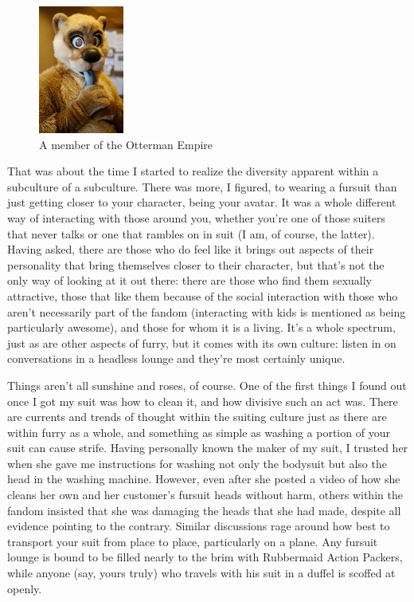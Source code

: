 \begin{figure}
  \begin{center}
    \includegraphics[width=0.25\textwidth]{content/assets/dressing-up--otterman-empire}
  \end{center}
  \caption{A member of the Otterman Empire}
\end{figure}
That was about the time I started to realize the diversity apparent within a subculture of a subculture.  There was more, I figured, to wearing a fursuit than just getting closer to your character, being your avatar.  It was a whole different way of interacting with those around you, whether you're one of those suiters that never talks or one that rambles on in suit (I am, of course, the latter).  Having asked, there are those who do feel like it brings out aspects of their personality that bring themselves closer to their character, but that's not the only way of looking at it out there: there are those who find them sexually attractive, those that like them because of the social interaction with those who aren't necessarily part of the fandom (interacting with kids is mentioned as being particularly awesome), and those for whom it is a living.  It's a whole spectrum, just as are other aspects of furry, but it comes with its own culture: listen in on conversations in a headless lounge and they're most certainly unique.

Things aren't all sunshine and roses, of course.  One of the first things I found out once I got my suit was how to clean it, and how divisive such an act was.  There are currents and trends of thought within the suiting culture just as there are within furry as a whole, and something as simple as washing a portion of your suit can cause strife.  Having personally known the maker of my suit, I trusted her when she gave me instructions for washing not only the bodysuit but also the head in the washing machine.  However, even after she posted a video of how she cleans her own and her customer's fursuit heads without harm, others within the fandom insisted that she was damaging the heads that she had made, despite all evidence pointing to the contrary.  Similar discussions rage around how best to transport your suit from place to place, particularly on a plane.  Any fursuit lounge is bound to be filled nearly to the brim with Rubbermaid Action Packers, while anyone (say, yours truly) who travels with his suit in a duffel is scoffed at openly.

